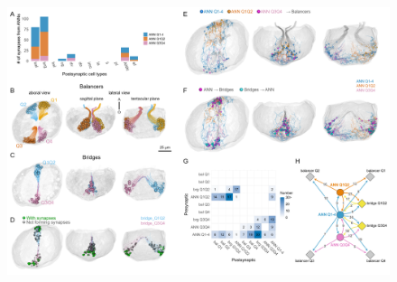 \documentclass[
  11pt,
]{article}
\begin{document}
\begin{figure}[H]

{\centering \includegraphics{figures/Figure3.png}

}


\end{figure}
\end{document}
